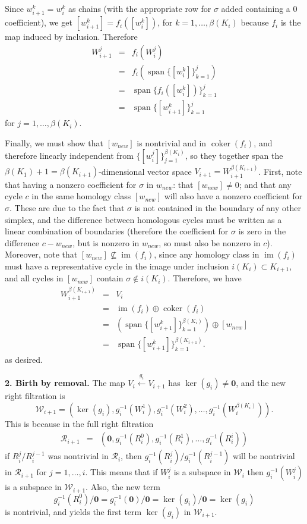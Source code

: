 \documentclass[12pt]{article}
\DeclareMathOperator{\coker}{coker}
\DeclareMathOperator{\im}{im}
\DeclareMathOperator{\spn}{span}
\begin{document}
Since $w_{i+1}^k = w_i^k$ as chains (with the appropriate row for $\sigma$ added containing a 0 coefficient), we get $[w_{i+1}^k] = f_i([w_i^k])$, for $k = 1,\ldots,\beta(K_i)$  because $f_i$ is the map induced by inclusion. Therefore
\begin{eqnarray*}
W_{i+1}^j & = & f_i(W_i^j) \\
& = & f_i\left(\spn \{[w_i^k]\}_{k=1}^j \right) \\
& = & \spn \{f_i([w_i^k])\}_{k=1}^j \\
& = & \spn \{[w_{i+1}^k]\}_{k=1}^j
\end{eqnarray*}
for $j=1,\ldots,\beta(K_i)$.

Finally, we must show that $[w_{new}]$ is nontrivial and in $\coker(f_i)$, and therefore linearly independent from $\{[w_i^j]\}_{j=1}^{\beta(K_i)}$, so they together span the $\beta(K_1)+1 = \beta(K_{i+1})$-dimensional vector space $V_{i+1} = W_{i+1}^{\beta(K_{i+1})}$. First, note that having a nonzero coefficient for $\sigma$ in $w_{new}$: that $[w_{new}] \neq 0$; and that any cycle $c$ in the same homology class $[w_{new}]$ will also have a nonzero coefficient for $\sigma$. These are due to the fact that $\sigma$ is not contained in the boundary of any other simplex, and the difference between homologous cycles must be written as a linear combination of boundaries (therefore the coefficient for $\sigma$ is zero in the difference $c - w_{new}$, but is nonzero in $w_{new}$, so must also be nonzero in $c$). Moreover, note that $[w_{new}] \not\subseteq \im(f_i)$, since any homology class in $\im(f_i)$ must have a representative cycle in the image under inclusion $i(K_i) \subset K_{i+1}$, and all cycles in $[w_{new}]$ contain $\sigma \not\in i(K_i)$. Therefore, we have
\begin{eqnarray*}
W_{i+1}^{\beta(K_{i+1})} & = & V_i \\
& = & \im(f_i) \oplus \coker(f_i) \\
& = & \left(\spn \{[w_{i+1}^k]\}_{k=1}^{\beta(K_i)} \right) \oplus [w_{new}] \\
& = & \spn \{[w_{i+1}^k]\}_{k=1}^{\beta(K_{i+1})}.
\end{eqnarray*}
as desired.

\textbf{2. Birth by removal.} The map $V_i \overset{g_i}{\longleftarrow} V_{i+1}$ has $\ker(g_i) \neq \textbf{0}$, and the new right filtration is
\[ \mathcal{W}_{i+1} = (\ker(g_i), g_i^{-1}(W_i^1), g_i^{-1}(W_i^2), \ldots, g_i^{-1}(W_i^{\beta(K_i)})). \]
This is because in the full right filtration
\begin{eqnarray}
\mathcal{R}_{i+1} & = & (\mathbf{0}, g_i^{-1}(R_i^0), g_i^{-1}(R_i^1), \ldots, g_i^{-1}(R_i^i)) \nonumber
\end{eqnarray}
if $R_i^j/ R_i^{j-1}$ was nontrivial in $\mathcal{R}_i$, then $g_i^{-1}(R_i^j)/ g_i^{-1}(R_i^{j-1})$ will be nontrivial in $\mathcal{R}_{i+1}$ for $j = 1,\ldots,i$. This means that if $W_i^j$ is a subspace in $\mathcal{W}_i$ then $g_i^{-1}(W_i^j)$ is a subspace in $\mathcal{W}_{i+1}$. Also, the new term
\[ g_i^{-1}(R_i^0)/\textbf{0} = g_i^{-1}(\textbf{0})/\textbf{0} = \ker(g_i)/\textbf{0} = \ker(g_i) \]
is nontrivial, and yields the first term $\ker(g_i)$ in $\mathcal{W}_{i+1}$.
\end{document}
